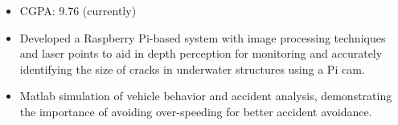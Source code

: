\documentclass[10pt,a4paper,ragged2e,withhyper]{altacv}
\begin{document}
\begin{paracol}{2}
\begin{itemize}
            \end{itemize}
        
            \begin{itemize}
                \item CGPA: 9.76 (currently)
            \end{itemize}


            \begin{itemize}
                \item Developed a Raspberry Pi-based system with image processing techniques and laser points to aid in depth perception for monitoring and accurately identifying the size of cracks in underwater structures using a Pi cam.
            \end{itemize}
            \divider
            
            \begin{itemize}
                \item Matlab simulation of vehicle behavior and accident analysis, demonstrating the importance of avoiding over-speeding for better accident avoidance.
            \end{itemize}
            \divider
            
            

    \end{paracol}
\end{document}
